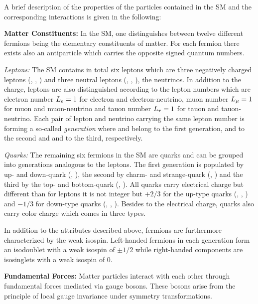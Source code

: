 A brief description of the properties of the particles contained in the SM and the corresponding interactions is given in the following:
\begin{description}

\item \textbf{Matter Constituents:}
In the SM, one distinguishes between twelve different fermions being the elementary constituents of matter. For each fermion there exists also an antiparticle which carries the opposite signed quantum numbers.
 \begin{description}
  \item \textit{Leptons:} The SM contains in total six leptons which are three negatively charged leptons (\lel, \lmu, \ltau) and three neutral leptons (\nue, \numu, \nutau), the neutrinos. In addition to the charge, leptons are also distinguished according to the lepton numbers which are electron number $L_{e} = 1$ for electron and electron-neutrino, muon number $L_{\mu} = 1$ for muon and muon-neutrino and tauon number $L_{\tau} = 1$ for tauon and tauon-neutrino. Each pair of lepton and neutrino carrying the same lepton number is forming a so-called \textit{generation} where \lel and \nue belong to the first generation, \lmu and \numu to the second and \ltau and \nutau to the third, respectively.
  \item \textit{Quarks:} The remaining six fermions in the SM are quarks and can be grouped into generations analogous to the leptons. The first generation is populated by up- and down-quark (\qu, \qd), the second by charm- and strange-quark (\qc, \qs) and the third by the top- and bottom-quark (\qt, \qb). All quarks carry electrical charge but different than for leptons it is not integer but $+2/3$ for the up-type quarks (\qu, \qc, \qt) and $-1/3$ for down-type quarks (\qd, \qs, \qb). Besides to the electrical charge, quarks also carry color charge which comes in three types.
 \end{description}
In addition to the attributes described above, fermions are furthermore characterized by the weak isospin. Left-handed fermions in each generation form an isodoublet with a weak isospin of $\pm 1/2$ while right-handed components are isosinglets with a weak isospin of 0. 
\item \textbf{Fundamental Forces:}
Matter particles interact with each other through fundamental forces mediated via gauge bosons. These bosons arise from the principle of local gauge invariance under symmetry transformations. 
 \begin{description}

\end{description}
\end{description}
